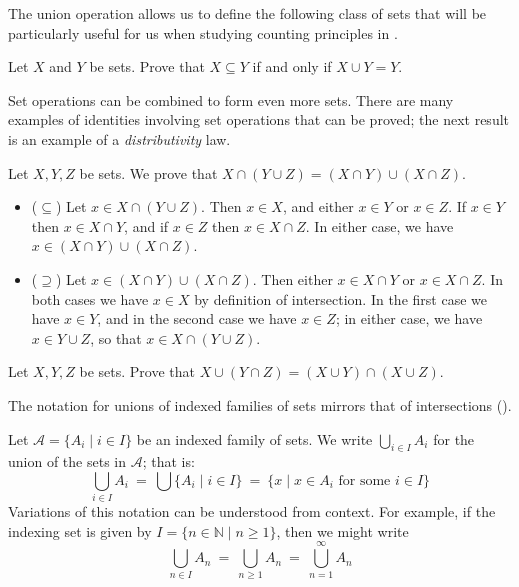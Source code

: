 The union operation allows us to define the following class of sets that will be particularly useful for us when studying counting principles in .

\begin{exercise}
Let $X$ and $Y$ be sets. Prove that $X \subseteq Y$ if and only if $X \cup Y = Y$.
\end{exercise}

Set operations can be combined to form even more sets. There are many examples of identities involving set operations that can be proved; the next result is an example of a \textit{distributivity} law.

\begin{example}
\label{exIntersectionDistributesOverUnion}
Let $X,Y,Z$ be sets. We prove that $X \cap (Y \cup Z) = (X \cap Y) \cup (X \cap Z)$.
\begin{itemize}
\item ($\subseteq$) Let $x \in X \cap (Y \cup Z)$. Then $x \in X$, and either $x \in Y$ or $x \in Z$. If $x \in Y$ then $x \in X \cap Y$, and if $x \in Z$ then $x \in X \cap Z$. In either case, we have $x \in (X \cap Y) \cup (X \cap Z)$.
\item ($\supseteq$) Let $x \in (X \cap Y) \cup (X \cap Z)$. Then either $x \in X \cap Y$ or $x \in X \cap Z$. In both cases we have $x \in X$ by definition of intersection. In the first case we have $x \in Y$, and in the second case we have $x \in Z$; in either case, we have $x \in Y \cup Z$, so that $x \in X \cap (Y \cup Z)$.
\end{itemize}
\end{example}

\begin{exercise}
\label{exUnionDistributesOverIntersection}
Let $X,Y,Z$ be sets. Prove that $X \cup (Y \cap Z) = (X \cup Y) \cap (X \cup Z)$.
\end{exercise}

The notation for unions of indexed families of sets mirrors that of intersections ().

\begin{notation}
\label{ntnUnionIndexed}
Let $\mathcal{A} = \{ A_i \mid i \in I \}$ be an indexed family of sets. We write $\displaystyle \bigcup_{i \in I} A_i$ for the union of the sets in $\mathcal{A}$; that is:
\[ \bigcup_{i \in I} A_i ~=~ \bigcup \{ A_i \mid i \in I \} ~=~ \{ x \mid x \in A_i \text{ for some } i \in I \} \]
Variations of this notation can be understood from context. For example, if the indexing set is given by $I = \{ n \in \mathbb{N} \mid n \ge 1 \}$, then we might write
\[ \bigcup_{n \in I} A_n ~=~ \bigcup_{n \ge 1} A_n ~=~ \bigcup_{n=1}^{\infty} A_n \]
\end{notation}

